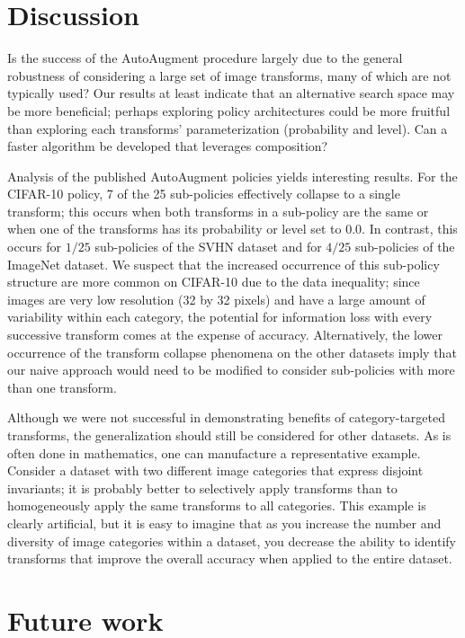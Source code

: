 \documentclass[10pt,twocolumn,letterpaper]{article}
\begin{document}
\section{Discussion}
  Is the success of the AutoAugment procedure largely due to the general robustness of considering a large set of image transforms, many of which are not typically used? Our results at least indicate that an alternative search space may be more beneficial; perhaps exploring policy architectures could be more fruitful than exploring each transforms' parameterization (probability and level). Can a faster algorithm be developed that leverages composition?

  Analysis of the published AutoAugment policies yields interesting results. For the CIFAR-10 policy, 7 of the 25 sub-policies effectively collapse to a single transform; this occurs when both transforms in a sub-policy are the same or when one of the transforms has its probability or level set to $0.0$. In contrast, this occurs for $1/25$ sub-policies of the SVHN dataset and for $4/25$ sub-policies of the ImageNet dataset. We suspect that the increased occurrence of this sub-policy structure are more common on CIFAR-10 due to the data inequality; since images are very low resolution (32 by 32 pixels) and have a large amount of variability within each category, the potential for information loss with every successive transform comes at the expense of accuracy. Alternatively, the lower occurrence of the transform collapse phenomena on the other datasets imply that our naive approach would need to be modified to consider sub-policies with more than one transform. 

  Although we were not successful in demonstrating benefits of category-targeted transforms, the generalization should still be considered for other datasets. As is often done in mathematics, one can manufacture a representative example. Consider a dataset with two different image categories that express disjoint invariants; it is probably better to selectively apply transforms than to homogeneously apply the same transforms to all categories. This example is clearly artificial, but it is easy to imagine that as you increase the number and diversity of image categories within a dataset, you decrease the ability to identify transforms that improve the overall accuracy when applied to the entire dataset.

\section{Future work}
\end{document}
